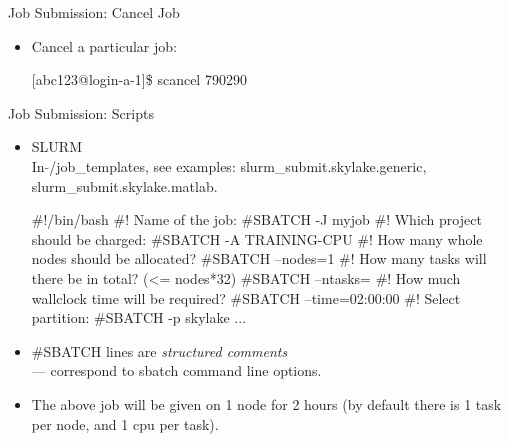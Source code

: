 \begin{frame}[fragile]{Job Submission: Cancel Job}
\begin{itemize}
\item{Cancel a particular job:}
\begin{semiverbatim}
\scriptsize
[abc123@login-a-1]\$ scancel {\color{red}790290}
\end{semiverbatim}
\end{itemize}
\end{frame}

\begin{frame}[fragile]{Job Submission: Scripts}
\begin{itemize}
\item{SLURM\hfill\\
In \alert{$\tilde{}$/job\_templates}, see examples: \alert{slurm\_submit.skylake.generic}, \alert{slurm\_submit.skylake.matlab}.}
  
\begin{semiverbatim}
\tiny
#!/bin/bash
#! Name of the job:
{\color<2->{red}#SBATCH} -J myjob
#! Which project should be charged:
{\color<2->{red}#SBATCH} -A TRAINING-CPU
#! How many whole nodes should be allocated?
{\color<2->{red}#SBATCH} --nodes=1
#! How many tasks will there be in total? (<= nodes*32)
{\color<2->{red}#SBATCH} --ntasks={}
#! How much wallclock time will be required?
{\color<2->{red}#SBATCH} --time=02:00:00
#! Select partition:
{\color<2->{red}#SBATCH} -p skylake
...
\end{semiverbatim}
\item<2->{{\color{red}\#SBATCH} lines are \emph{structured comments}\hfill\\
\qquad --- correspond to sbatch command line options.}
\item<3->{\alert{The above job will be given {} on 1 node for 2 hours (by default there is 1 task per node, and 1 cpu per task).}}
\end{itemize}
\end{frame}

